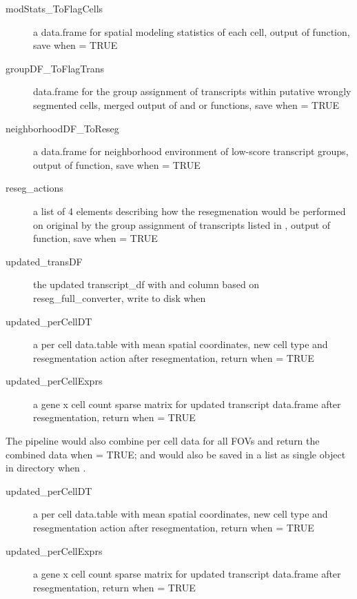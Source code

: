 \documentclass[letterpaper]{book}
\begin{document}
\begin{Details}
\begin{description}
\item[modStats\_ToFlagCells] a data.frame for spatial modeling statistics of each cell, output of  function, save when  = TRUE
\item[groupDF\_ToFlagTrans] data.frame for the group assignment of transcripts within putative wrongly segmented cells, merged output of  and  or  functions, save when  = TRUE
\item[neighborhoodDF\_ToReseg] a data.frame for neighborhood environment of low-score transcript groups, output of  function, save when  = TRUE
\item[reseg\_actions] a list of 4 elements describing how the resegmenation would be performed on original  by the group assignment of transcripts listed in , output of  function, save when  = TRUE
\item[updated\_transDF] the updated transcript\_df with  and  column based on reseg\_full\_converter, write to disk when 
\item[updated\_perCellDT] a per cell data.table with mean spatial coordinates, new cell type and resegmentation action after resegmentation, return when  = TRUE
\item[updated\_perCellExprs] a gene x cell count sparse matrix for updated transcript data.frame after resegmentation, return when  = TRUE

\end{description}

The pipeline would also combine per cell data for all FOVs and return the combined data when  = TRUE;  and  would also be saved in a list as single  object in  directory when  .
\begin{description}

\item[updated\_perCellDT] a per cell data.table with mean spatial coordinates, new cell type and resegmentation action after resegmentation, return when  = TRUE
\item[updated\_perCellExprs] a gene x cell count sparse matrix for updated transcript data.frame after resegmentation, return when  = TRUE

\end{description}

\end{Details}
\end{document}
